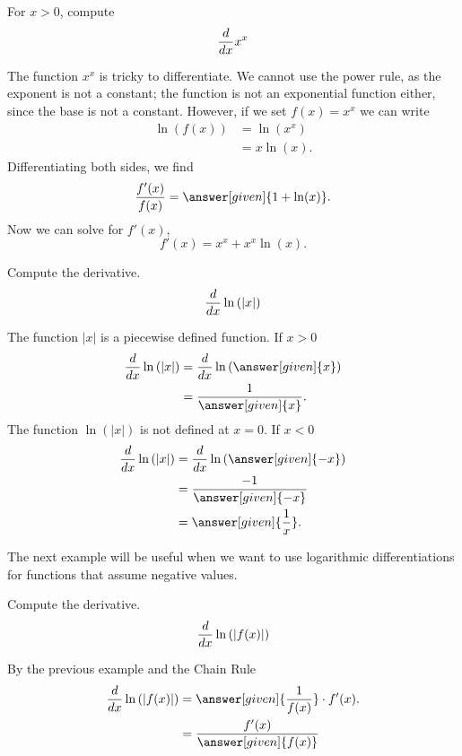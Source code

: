 \documentclass{ximera}
\begin{document}
	\begin{example}
		For  $x>0$, compute 
		\[
		\frac{d}{\mathop{}\!d x} x^x
		\]
		\begin{explanation}
			The function $x^x$ is tricky to differentiate. We cannot use the power
			rule, as the exponent is not a constant; the function is not an exponential function either, since the base is not a constant. However, if we set $f(x) =
			x^x$ we can write
			\begin{align*}
				\ln(f(x)) &= \ln\left(x^x\right)\\
				&=x\ln(x).
			\end{align*}
			Differentiating both sides, we find
			\[
			\frac{f'(x)}{f(x)} = \answer[given]{1 + \ln(x)}.
			\]
			Now we can solve for $f'(x)$, 
			\[
			f'(x) = x^x + x^x\ln(x).
			\]
		\end{explanation}
	\end{example}
	
	
	\begin{example}
		Compute the derivative.
		\[
		\frac{d}{\mathop{}\!d x}\ln{(|x|)}
		\]
		\begin{explanation}
			The function $|x|$ is a piecewise defined function.  If $x>0$
			\begin{align*}
				\ddx\ln{(|x|)} &= \ddx\ln{(\answer[given]{x})}\\
				&=\frac{1}{\answer[given]{x}}.
			\end{align*}
			The function $\ln{(|x|)}$ is not defined at $x=0$.  If $x<0$
			\begin{align*}
				\ddx\ln{(|x|)} &= \ddx\ln{(\answer[given]{-x})}\\
				&=\frac{-1}{\answer[given]{-x}}\\
				&=\answer[given]{\frac{1}{x}}.
			\end{align*}
		\end{explanation}
	\end{example}
	
	The next  example will be useful when we want to use logarithmic differentiations for functions that  assume negative values. 
	
	
	\begin{example}
		Compute the derivative.
		\[
		\frac{d}{\mathop{}\!d x}\ln{(|f(x)|)}
		\]
		\begin{explanation}
			By the previous example and the Chain Rule
			\begin{align*}
				\ddx\ln{(|f(x)|)} &=\answer[given]{\frac{1}{f(x)}}\cdot f'(x).\\
				&=\frac{f'(x)}{\answer[given]{f(x)}}
			\end{align*}
		\end{explanation}
	\end{example}
	
\end{document}
